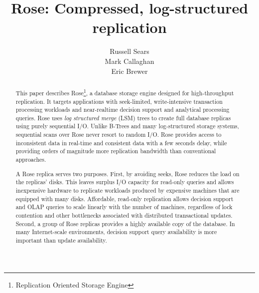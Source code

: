 \documentclass{vldb}
\newcommand{\rows}{Rose\xspace}
\begin{document}
\title{{\ttlit \rows}: Compressed, log-structured replication}
%
%
\author{
\alignauthor
Russell Sears\\
\alignauthor
Mark Callaghan\\
\alignauthor
Eric Brewer\\
}
\maketitle
\begin{abstract}
This paper describes \rows\footnote{Replication Oriented Storage Engine}, a database
storage engine designed for high-throughput replication.  It targets
applications with seek-limited, write-intensive transaction
processing workloads and near-realtime decision support and analytical
processing queries.  \rows uses {\em log structured merge} (LSM) trees
to create full database replicas using purely sequential I/O.  Unlike B-Trees and many log-structured storage systems, sequential scans over \rows never resort to random I/O.  \rows
provides access to inconsistent data in real-time and consistent data
with a few seconds delay, while providing orders of magnitude more
replication bandwidth than conventional approaches.

A \rows replica serves two purposes.  First, by avoiding seeks, \rows
reduces the load on the replicas' disks.  This leaves surplus I/O capacity
for read-only queries and allows inexpensive hardware to replicate
workloads produced by expensive machines that are equipped with many disks.
Affordable, read-only replication allows decision support and OLAP queries to
scale linearly with the number of machines, regardless of lock
contention and other bottlenecks associated with distributed
transactional updates.  Second, a group of \rows replicas provides a highly
available copy of the database.  In many Internet-scale environments,
decision support query availability is more important than update availability.



\end{abstract}
\end{document}
